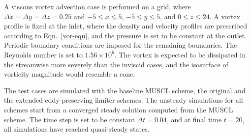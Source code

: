 A viscous vortex advection case is performed on a grid, where $\Delta x=\Delta y=\Delta z=0.25$ and $-5\le x \le5$, $-5\le y \le 5$, and $0\le z \le 24$. A vortex profile is fixed at the inlet, where the density and velocity profiles are prescribed according to Eqn.~\ref{vor-equ}, and the pressure is set to be constant at the outlet. Periodic boundary conditions are imposed for the remaining boundaries. The Reynolds number is set to $1.56\times10^6$. The vortex is expected to be dissipated in the streamwise more severely than the inviscid cases, and the isosurface of vorticity magnitude would resemble a cone.

The test cases are simulated with the baseline MUSCL scheme, the original and the extended eddy-preserving limiter schemes. The unsteady simulations for all schemes start from a converged steady solution computed from the MUSCL scheme. The time step is set to be constant $\Delta t=0.04$, and at final time $t=20$, all simulations have reached quasi-steady states.

